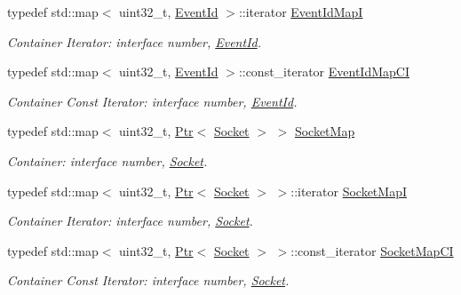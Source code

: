 \begin{DoxyCompactItemize}
typedef std\+::map$<$ uint32\+\_\+t, \hyperlink{classns3_1_1EventId}{Event\+Id} $>$\+::iterator \hyperlink{classns3_1_1Radvd_ae2bbceecbc9c1188ed4e43026a00d4b2}{Event\+Id\+MapI}
\begin{DoxyCompactList}\small\item\em Container Iterator\+: interface number, \hyperlink{classns3_1_1EventId}{Event\+Id}. \end{DoxyCompactList}\item 
typedef std\+::map$<$ uint32\+\_\+t, \hyperlink{classns3_1_1EventId}{Event\+Id} $>$\+::const\+\_\+iterator \hyperlink{classns3_1_1Radvd_a199bf82edbd1366ed0d430a093478075}{Event\+Id\+Map\+CI}
\begin{DoxyCompactList}\small\item\em Container Const Iterator\+: interface number, \hyperlink{classns3_1_1EventId}{Event\+Id}. \end{DoxyCompactList}\item 
typedef std\+::map$<$ uint32\+\_\+t, \hyperlink{classns3_1_1Ptr}{Ptr}$<$ \hyperlink{classns3_1_1Socket}{Socket} $>$ $>$ \hyperlink{classns3_1_1Radvd_a58b325c83c73d2054a896868cc2f5d7b}{Socket\+Map}
\begin{DoxyCompactList}\small\item\em Container\+: interface number, \hyperlink{classns3_1_1Socket}{Socket}. \end{DoxyCompactList}\item 
typedef std\+::map$<$ uint32\+\_\+t, \hyperlink{classns3_1_1Ptr}{Ptr}$<$ \hyperlink{classns3_1_1Socket}{Socket} $>$ $>$\+::iterator \hyperlink{classns3_1_1Radvd_a78f280d051c55dad2a45f44a6bf8711a}{Socket\+MapI}
\begin{DoxyCompactList}\small\item\em Container Iterator\+: interface number, \hyperlink{classns3_1_1Socket}{Socket}. \end{DoxyCompactList}\item 
typedef std\+::map$<$ uint32\+\_\+t, \hyperlink{classns3_1_1Ptr}{Ptr}$<$ \hyperlink{classns3_1_1Socket}{Socket} $>$ $>$\+::const\+\_\+iterator \hyperlink{classns3_1_1Radvd_aaf9bb5cc49e74d40eced93ed630a0cd4}{Socket\+Map\+CI}
\begin{DoxyCompactList}\small\item\em Container Const Iterator\+: interface number, \hyperlink{classns3_1_1Socket}{Socket}. \end{DoxyCompactList}\end{DoxyCompactItemize}
